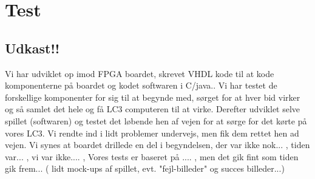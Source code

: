 \chapter{Test}\label{cha:test}
\section{Udkast!!}
Vi har udviklet op imod FPGA boardet, skrevet VHDL kode til at kode komponenterne på boardet og kodet softwaren i C/java.. Vi har testet de forskellige komponenter for sig til at begynde med, sørget for at hver bid virker og så samlet det hele og få LC3 computeren til at virke. Derefter udviklet selve spillet (softwaren) og testet det løbende hen af vejen for at sørge for det kørte på vores LC3. Vi rendte ind i lidt problemer undervejs, men fik dem rettet hen ad vejen.
Vi synes at boardet drillede en del i begyndelsen, der var ikke nok... , tiden var... , vi var ikke.... ,
Vores tests er baseret på .... , men det gik fint som tiden gik frem...
( lidt mock-ups af spillet, evt. "fejl-billeder" og succes billeder...)